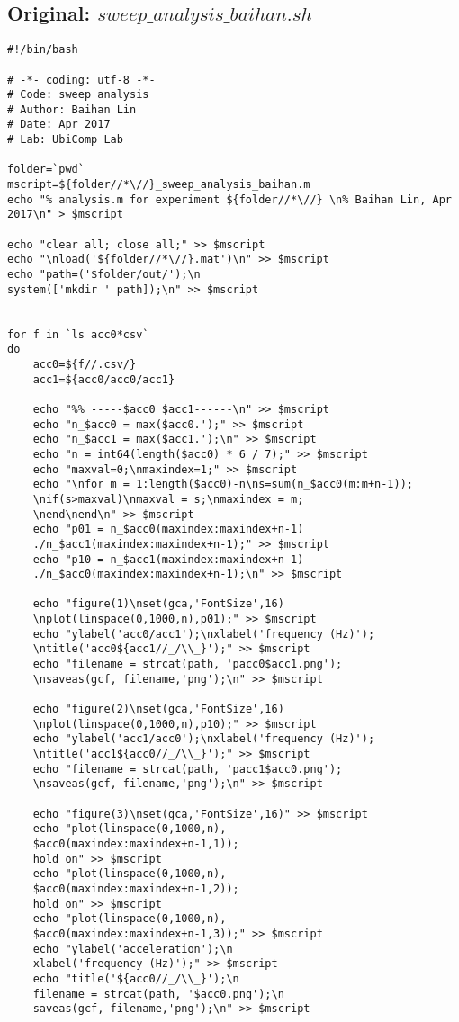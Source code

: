\documentclass{sigchi}
\begin{document}
\subsection{Original: $sweep\_analysis\_baihan.sh$}\label{ss:swp_ana.sh}
\begin{lstlisting}
#!/bin/bash

# -*- coding: utf-8 -*-
# Code: sweep analysis
# Author: Baihan Lin
# Date: Apr 2017
# Lab: UbiComp Lab

folder=`pwd`
mscript=${folder//*\//}_sweep_analysis_baihan.m
echo "% analysis.m for experiment ${folder//*\//} \n% Baihan Lin, Apr 2017\n" > $mscript

echo "clear all; close all;" >> $mscript
echo "\nload('${folder//*\//}.mat')\n" >> $mscript
echo "path=('$folder/out/');\n
system(['mkdir ' path]);\n" >> $mscript


for f in `ls acc0*csv`
do
    acc0=${f//.csv/}
    acc1=${acc0/acc0/acc1}

	echo "%% -----$acc0 $acc1------\n" >> $mscript
    echo "n_$acc0 = max($acc0.');" >> $mscript
    echo "n_$acc1 = max($acc1.');\n" >> $mscript
    echo "n = int64(length($acc0) * 6 / 7);" >> $mscript
    echo "maxval=0;\nmaxindex=1;" >> $mscript
    echo "\nfor m = 1:length($acc0)-n\ns=sum(n_$acc0(m:m+n-1));
    \nif(s>maxval)\nmaxval = s;\nmaxindex = m;
    \nend\nend\n" >> $mscript
    echo "p01 = n_$acc0(maxindex:maxindex+n-1)
    ./n_$acc1(maxindex:maxindex+n-1);" >> $mscript
    echo "p10 = n_$acc1(maxindex:maxindex+n-1)
    ./n_$acc0(maxindex:maxindex+n-1);\n" >> $mscript

	echo "figure(1)\nset(gca,'FontSize',16)
    \nplot(linspace(0,1000,n),p01);" >> $mscript
	echo "ylabel('acc0/acc1');\nxlabel('frequency (Hz)');
    \ntitle('acc0${acc1//_/\\_}');" >> $mscript
	echo "filename = strcat(path, 'pacc0$acc1.png');
    \nsaveas(gcf, filename,'png');\n" >> $mscript

	echo "figure(2)\nset(gca,'FontSize',16)
    \nplot(linspace(0,1000,n),p10);" >> $mscript
	echo "ylabel('acc1/acc0');\nxlabel('frequency (Hz)');
    \ntitle('acc1${acc0//_/\\_}');" >> $mscript
	echo "filename = strcat(path, 'pacc1$acc0.png');
    \nsaveas(gcf, filename,'png');\n" >> $mscript

	echo "figure(3)\nset(gca,'FontSize',16)" >> $mscript
	echo "plot(linspace(0,1000,n),
    $acc0(maxindex:maxindex+n-1,1)); 
    hold on" >> $mscript
	echo "plot(linspace(0,1000,n),
    $acc0(maxindex:maxindex+n-1,2)); 
    hold on" >> $mscript
	echo "plot(linspace(0,1000,n),
    $acc0(maxindex:maxindex+n-1,3));" >> $mscript
	echo "ylabel('acceleration');\n
    xlabel('frequency (Hz)');" >> $mscript
	echo "title('${acc0//_/\\_}');\n
    filename = strcat(path, '$acc0.png');\n
    saveas(gcf, filename,'png');\n" >> $mscript


\end{lstlisting}
\end{document}
